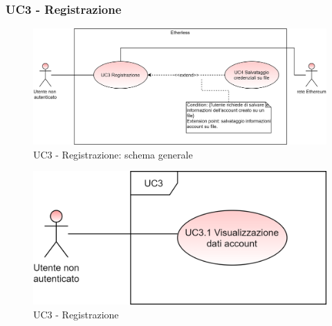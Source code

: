\subsubsection{UC3 - Registrazione}
\begin{figure}[H]
	\centering
	\includegraphics[scale=\ucs]{./res/img/UC3G.png}
	\caption {UC3 - Registrazione: schema generale}
\end{figure}
\begin{figure}[H]
	\centering
	\includegraphics[scale=\ucs]{./res/img/UC3.png}
	\caption {UC3 - Registrazione}
\end{figure}
